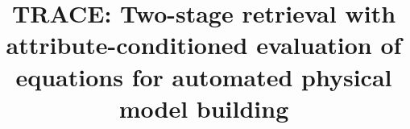 \documentclass[preprint,review,12pt,authoryear]{elsarticle}
\begin{document}
\begin{frontmatter}

\title{TRACE: Two-stage retrieval with attribute-conditioned evaluation of equations for automated physical model building}

\author{}

\begin{abstract}

\end{abstract}

\begin{highlights}

\end{highlights}

\begin{keyword}

\end{keyword}

\end{frontmatter}

\linenumbers












\appendix
\setcounter{figure}{0}\setcounter{table}{0}
\makeatletter{}\makeatother




\end{document}
